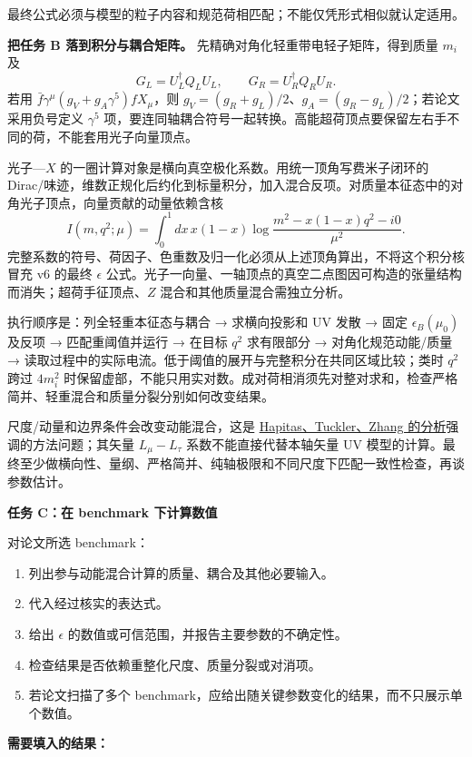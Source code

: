 \documentclass[
  chinese,
  UTF8]{ctexart}
\providecommand{\tightlist}{%
  \setlength{\itemsep}{0pt}\setlength{\parskip}{0pt}}
\begin{document}
最终公式必须与模型的粒子内容和规范荷相匹配；不能仅凭形式相似就认定适用。

\textbf{把任务 B 落到积分与耦合矩阵。}
先精确对角化轻重带电轻子矩阵，得到质量 \(m_i\) 及 \[
G_L=U_L^\dagger Q_LU_L,\qquad G_R=U_R^\dagger Q_RU_R.
\] 若用 \(\bar f\gamma^\mu(g_V+g_A\gamma^5)fX_\mu\)，则
\(g_V=(g_R+g_L)/2\)、\(g_A=(g_R-g_L)/2\)；若论文采用负号定义
\(\gamma^5\)
项，要连同轴耦合符号一起转换。高能超荷顶点要保留左右手不同的荷，不能套用光子向量顶点。

光子---\(X\) 的一圈计算对象是横向真空极化系数。用统一顶角写费米子闭环的
Dirac/味迹，维数正规化后约化到标量积分，加入混合反项。对质量本征态中的对角光子顶点，向量贡献的动量依赖含核
\[
I(m,q^2;\mu)=\int_0^1dx\,x(1-x)
\log\frac{m^2-x(1-x)q^2-i0}{\mu^2}.
\]
完整系数的符号、荷因子、色重数及归一化必须从上述顶角算出，不将这个积分核冒充
v6 的最终 \(\epsilon\)
公式。光子一向量、一轴顶点的真空二点图因可构造的张量结构而消失；超荷手征顶点、\(Z\)
混合和其他质量混合需独立分析。

执行顺序是：列全轻重本征态与耦合 → 求横向投影和 UV 发散 → 固定
\(\epsilon_B(\mu_0)\) 及反项 → 匹配重阈值并运行 → 在目标 \(q^2\)
求有限部分 → 对角化规范动能/质量 →
读取过程中的实际电流。低于阈值的展开与完整积分在共同区域比较；类时
\(q^2\) 跨过 \(4m_i^2\)
时保留虚部，不能只用实对数。成对荷相消须先对整对求和，检查严格简并、轻重混合和质量分裂分别如何改变结果。

尺度/动量和边界条件会改变动能混合，这是
\href{https://arxiv.org/abs/2108.12440}{Hapitas、Tuckler、Zhang
的分析}强调的方法问题；其矢量 \(L_\mu-L_\tau\) 系数不能直接代替本轴矢量
UV
模型的计算。最终至少做横向性、量纲、严格简并、纯轴极限和不同尺度下匹配一致性检查，再谈参数估计。

\textbf{任务 C：在 benchmark 下计算数值}

对论文所选 benchmark：

\begin{enumerate}
\def\labelenumi{\arabic{enumi}.}
\tightlist
\item
  列出参与动能混合计算的质量、耦合及其他必要输入。
\item
  代入经过核实的表达式。
\item
  给出 \(\epsilon\) 的数值或可信范围，并报告主要参数的不确定性。
\item
  检查结果是否依赖重整化尺度、质量分裂或对消项。
\item
  若论文扫描了多个
  benchmark，应给出随关键参数变化的结果，而不只展示单个数值。
\end{enumerate}

\textbf{需要填入的结果：}
\end{document}
